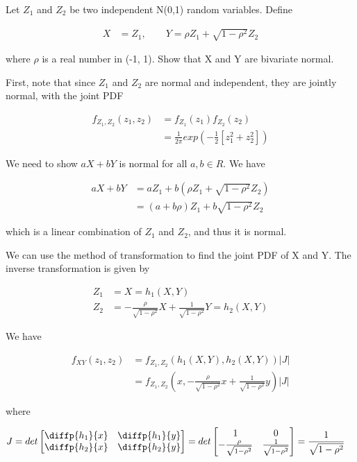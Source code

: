 \documentclass[11pt]{article} %
\begin{document}
Let $Z_1$ and $Z_2$ be two independent N(0,1) random variables. Define

\begin{align*}
	X &= Z_1, \qquad Y= \rho Z_1 + \sqrt{1-\rho^2} Z_2
\end{align*}

where $\rho$ is a real number in (-1, 1). Show that X and Y are bivariate normal.

First, note that since $Z_1$ and $Z_2$ are normal and independent, they are jointly normal, with the joint PDF

\begin{align*}
	f_{Z_1, Z_2} (z_1, z_2) &= f_{Z_1}(z_1) f_{Z_2}(z_2) \\
	&= \frac{1}{2 \pi} exp \left(-\frac{1}{2} [z_1^2 + z_2^2] \right)
\end{align*}

We need to show $aX+bY$ is normal for all $a,b \in R$. We have

\begin{align*}
	aX + bY &= a Z_1 + b(\rho Z_1 + \sqrt{1- \rho^2} Z_2) \\
	&= (a + b\rho) Z_1 + b \sqrt{1- \rho^2} Z_2
\end{align*}

which is a linear combination of $Z_1$ and $Z_2$, and thus it is normal.


We can use the method of transformation to find the joint PDF of X and Y. The inverse transformation is given by

\begin{align*}
	Z_1 &= X = h_1(X, Y) \\
	Z_2 &= -\frac{\rho}{\sqrt{1-\rho^2}} X + \frac{1}{\sqrt{1-\rho^2}} Y = h_2(X, Y)
\end{align*}

We have

\begin{align*}
	f_{XY}(z_1, z_2) &= f_{Z_1, Z_2} (h_1(X, Y), h_2(X, Y)) |J|\\
	&= f_{Z_1, Z_2} (x, -\frac{\rho}{\sqrt{1-\rho^2}} x + \frac{1}{\sqrt{1-\rho^2}} y) |J|
\end{align*}

where 

\begin{align*}
	J &= det \begin{bmatrix}
		\diffp{h_1}{x} & \diffp{h_1}{y} \\
		\diffp{h_2}{x} & \diffp{h_2}{y}
	\end{bmatrix} = det \begin{bmatrix}
	1 & 0 \\
	-\frac{\rho}{\sqrt{1-\rho^2}} & \frac{1}{\sqrt{1-\rho^2}}
\end{bmatrix} = \frac{1}{\sqrt{1-\rho^2}}
\end{align*}
\end{document}
